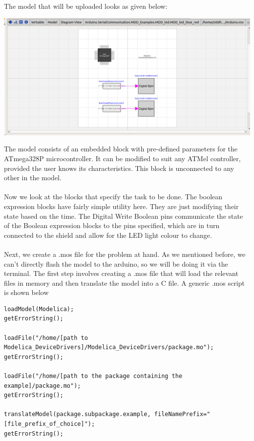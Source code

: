 \documentclass{hitec}
\begin{document}
The model that will be uploaded looks as given below:
\begin{center}
\includegraphics[scale=0.25]{Model.png}
\end{center}

The model consists of an embedded block with pre-defined parameters for the ATmega328P microcontroller. It can be modified to suit any ATMel controller, provided the user knows its characteristics. This block is unconnected to any other in the model.
\\
\\
Now we look at the blocks that specify the task to be done. The boolean expression blocks have fairly simple utility here. They are just modifying their state based on the time. The Digital Write Boolean pins communicate the state of the Boolean expression blocks to the pins specified, which are in turn connected to the shield and allow for the LED light colour to change.
\\
\\
Next, we create a .mos file for the problem at hand. As we mentioned before, we can't directly flash the model to the arduino, so we will be doing it via the terminal. The first step involves creating a .mos file that will load the relevant files in memory and then translate the model into a C file. A generic .mos script is shown below
\begin{lstlisting}
loadModel(Modelica);
getErrorString();

loadFile("/home/[path to Modelica_DeviceDrivers]/Modelica_DeviceDrivers/package.mo");
getErrorString();

loadFile("/home/[path to the package containing the example]/package.mo");
getErrorString();

translateModel(package.subpackage.example, fileNamePrefix="[file_prefix_of_choice]");
getErrorString();
\end{lstlisting}
\end{document}
